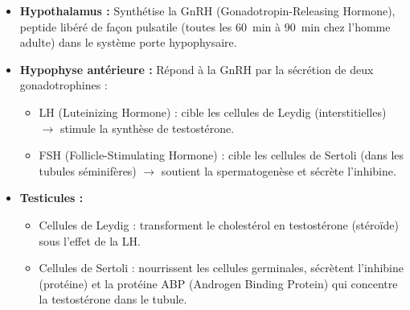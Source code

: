 \documentclass[11pt]{article}
\newcommand{\cle}[1]{{\popxbold\color{popdark}#1}}
\begin{document}
\begin{itemize}
    \item \textbf{Hypothalamus :} Synthétise la \cle{GnRH} (Gonadotropin-Releasing Hormone), peptide libéré de façon \cle{pulsatile} (toutes les \SI{60}{\minute} à \SI{90}{\minute} chez l'homme adulte) dans le système porte hypophysaire.
    \item \textbf{Hypophyse antérieure :} Répond à la GnRH par la sécrétion de deux gonadotrophines :
        \begin{itemize}
            \item \cle{LH} (Luteinizing Hormone) : cible les \cle{cellules de Leydig} (interstitielles) $\rightarrow$ stimule la synthèse de testostérone.
            \item \cle{FSH} (Follicle-Stimulating Hormone) : cible les \cle{cellules de Sertoli} (dans les tubules séminifères) $\rightarrow$ soutient la spermatogenèse et sécrète l'inhibine.
        \end{itemize}
    \item \textbf{Testicules :}
        \begin{itemize}
            \item Cellules de Leydig : transforment le cholestérol en \cle{testostérone} (stéroïde) sous l'effet de la LH.
            \item Cellules de Sertoli : nourrissent les cellules germinales, sécrètent l'\cle{inhibine} (protéine) et la protéine ABP (Androgen Binding Protein) qui concentre la testostérone dans le tubule.
        \end{itemize}
\end{itemize}
\end{document}
